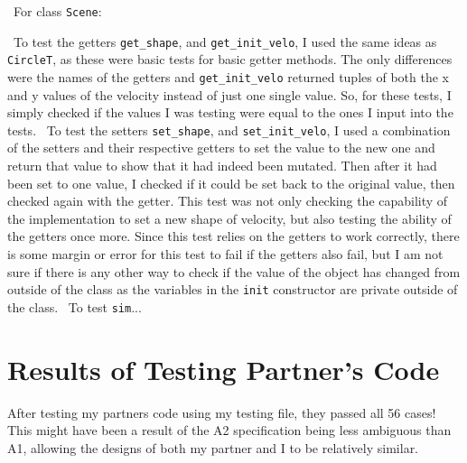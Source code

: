 \documentclass[12pt]{article}
\begin{document}
~\newline\noindent For class \verb|Scene|:

~\newline\noindent To test the getters \verb|get_shape|, and \verb|get_init_velo|, I used the same ideas as \verb|CircleT|, as these were basic tests for basic getter methods. The only differences were the names of the getters and \verb|get_init_velo| returned tuples of both the x and y values of the velocity instead of just one single value. So, for these tests, I simply checked if the values I was testing were equal to the ones I input into the tests. 
~\newline\noindent To test the setters \verb|set_shape|, and \verb|set_init_velo|, I used a combination of the setters and their respective getters to set the value to the new one and return that value to show that it had indeed been mutated. Then after it had been set to one value, I checked if it could be set back to the original value, then checked again with the getter. This test was not only checking the capability of the implementation to set a new shape of velocity, but also testing the ability of the getters once more. Since this test relies on the getters to work correctly, there is some margin or error for this test to fail if the getters also fail, but I am not sure if there is any other way to check if the value of the object has changed from outside of the class as the variables in the \verb|init| constructor are private outside of the class. 
~\newline\noindent To test \verb|sim|...



\section{Results of Testing Partner's Code}

After testing my partners code using my testing file, they passed all 56 cases! This might have been a result of the A2 specification being less ambiguous than A1, allowing the designs of both my partner and I to be relatively similar.
\end{document}
